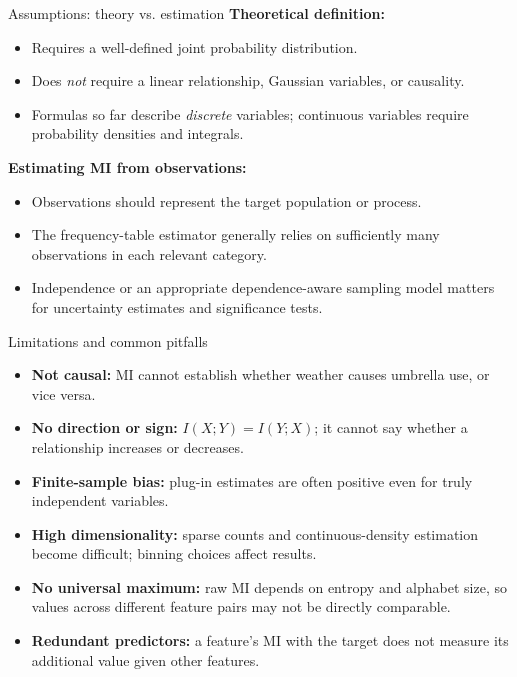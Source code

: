 \documentclass[aspectratio=43,11pt]{beamer}
\begin{document}
\begin{frame}{Assumptions: theory vs. estimation}
\small
\textbf{Theoretical definition:}
\begin{itemize}
\item Requires a well-defined joint probability distribution.
\item Does \emph{not} require a linear relationship, Gaussian variables, or causality.
\item Formulas so far describe \emph{discrete} variables; continuous variables require probability densities and integrals.
\end{itemize}

\vspace{0.5em}
\textbf{Estimating MI from observations:}
\begin{itemize}
\item Observations should represent the target population or process.
\item The frequency-table estimator generally relies on sufficiently many observations in each relevant category.
\item Independence or an appropriate dependence-aware sampling model matters for uncertainty estimates and significance tests.
\end{itemize}
\end{frame}

\begin{frame}{Limitations and common pitfalls}
\small
\begin{itemize}
\item \textbf{Not causal:} MI cannot establish whether weather causes umbrella use, or vice versa.
\item \textbf{No direction or sign:} $I(X;Y)=I(Y;X)$; it cannot say whether a relationship increases or decreases.
\item \textbf{Finite-sample bias:} plug-in estimates are often positive even for truly independent variables.
\item \textbf{High dimensionality:} sparse counts and continuous-density estimation become difficult; binning choices affect results.
\item \textbf{No universal maximum:} raw MI depends on entropy and alphabet size, so values across different feature pairs may not be directly comparable.
\item \textbf{Redundant predictors:} a feature's MI with the target does not measure its additional value given other features.
\end{itemize}
\end{frame}
\end{document}
